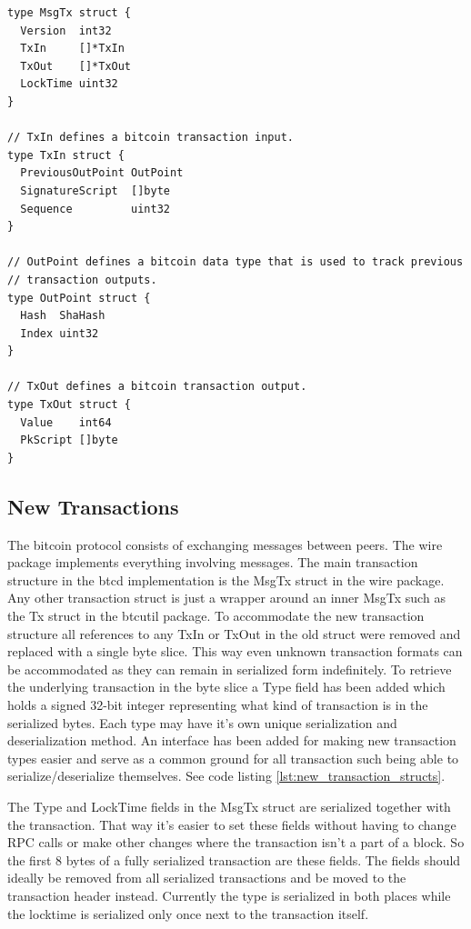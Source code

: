 \documentclass[12pt]{article}
\begin{document}
\begin{lstlisting}[float=!h,caption={Original Btcd Transaction Structure},label=lst:bctd_transaction_structs]
type MsgTx struct {
  Version  int32
  TxIn     []*TxIn
  TxOut    []*TxOut
  LockTime uint32
}

// TxIn defines a bitcoin transaction input.
type TxIn struct {
  PreviousOutPoint OutPoint
  SignatureScript  []byte
  Sequence         uint32
}

// OutPoint defines a bitcoin data type that is used to track previous
// transaction outputs.
type OutPoint struct {
  Hash  ShaHash
  Index uint32
}

// TxOut defines a bitcoin transaction output.
type TxOut struct {
  Value    int64
  PkScript []byte
}
\end{lstlisting}

\subsection{New Transactions}\label{subsec:new_transactions}
The bitcoin protocol consists of exchanging messages between peers. The wire package implements everything involving messages. The main transaction structure in the btcd implementation is the MsgTx struct in the wire package. Any other transaction struct is just a wrapper around an inner MsgTx such as the Tx struct in the btcutil package.
To accommodate the new transaction structure all references to any TxIn or 
TxOut in the old struct were removed and replaced with a single byte slice. This way even unknown transaction formats can be accommodated as they can remain in serialized form indefinitely. To retrieve the underlying transaction in the byte slice a Type field has been added which holds a signed 32-bit integer representing what kind of transaction is in the serialized bytes. Each type may have it's own unique serialization and deserialization method. An interface has been added for making new transaction types easier and serve as a common ground for all transaction such being able to serialize/deserialize themselves. See code listing \ref{lst:new_transaction_structs}.

The Type and LockTime fields in the MsgTx struct are serialized together with the transaction. That way it's easier to set these fields without having to change RPC calls or make other changes where the transaction isn't a part of a block. So the first 8 bytes of a fully serialized transaction are these fields. The fields should ideally be removed from all serialized transactions and be moved to the transaction header instead. Currently the type is serialized in both places while the locktime is serialized only once next to the transaction itself.
\end{document}
